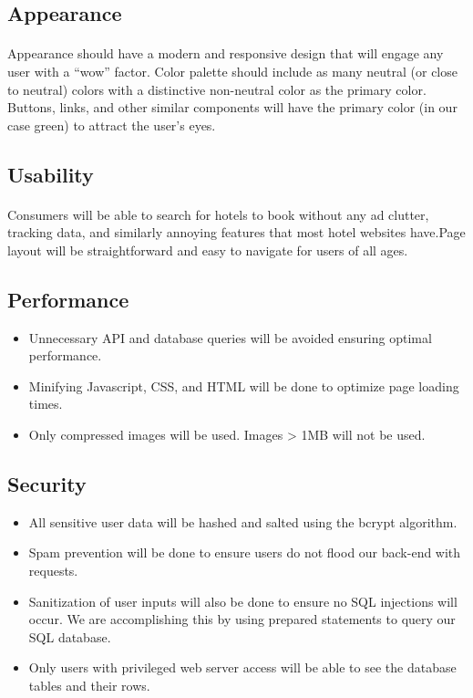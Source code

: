 \documentclass[]{article}
\begin{document}
\subsection{Appearance}
\paragraph{}
Appearance should have a modern and responsive design that will engage any user with a “wow” factor. Color palette should include as many neutral (or close to neutral) colors with a distinctive non-neutral color as the primary color. Buttons, links, and other similar components will have the primary color (in our case green) to attract the user's eyes.
\subsection{Usability}
\paragraph{}
Consumers will be able to search for hotels to book without any ad clutter, tracking data, and similarly annoying features that most hotel websites have.Page layout will be straightforward and easy to navigate for users of all ages.
\subsection{Performance}
\begin{itemize}
    \item Unnecessary API and database queries will be avoided ensuring optimal performance. 
    \item Minifying Javascript, CSS, and HTML will be done to optimize page loading times.
    \item Only compressed images will be used. Images > 1MB will not be used.
\end{itemize}

\subsection{Security}
\begin{itemize}
    \item All sensitive user data will be hashed and salted using the bcrypt algorithm.  
    \item Spam prevention will be done to ensure users do not flood our back-end with requests. 
    \item Sanitization of user inputs will also be done to ensure no SQL injections will occur. We are accomplishing this by using prepared statements to query our SQL database.
    \item Only users with privileged web server access will be able to see the database tables and their rows.
\end{itemize}
\end{document}
